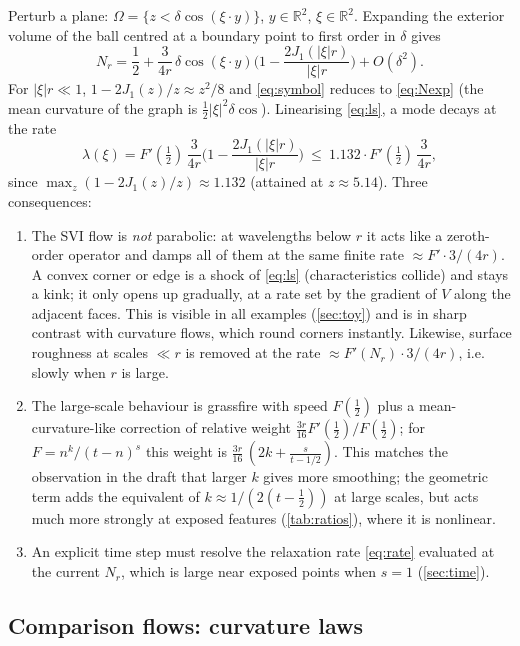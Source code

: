 \documentclass[11pt]{article}
\newcommand{\R}{\mathbb{R}}
\newcommand{\N}{N_r}
\begin{document}
Perturb a plane: $\Omega=\{z<\delta\cos(\xi\cdot y)\}$, $y\in\R^2$, $\xi\in\R^2$. Expanding the exterior
volume of the ball centred at a boundary point to first order in $\delta$ gives
\begin{equation}\label{eq:symbol}
\N = \frac12+\frac{3}{4r}\,\delta\cos(\xi\cdot y)\Big(1-\frac{2J_1(|\xi| r)}{|\xi| r}\Big)+O(\delta^2).
\end{equation}
For $|\xi|r\ll1$, $1-2J_1(z)/z\approx z^2/8$ and \eqref{eq:symbol} reduces to \eqref{eq:Nexp} (the
mean curvature of the graph is $\frac12|\xi|^2\delta\cos$). Linearising \eqref{eq:ls}, a mode decays at
the rate
\begin{equation}\label{eq:rate}
\lambda(\xi)=F'(\tfrac12)\,\frac{3}{4r}\Big(1-\frac{2J_1(|\xi| r)}{|\xi| r}\Big)\ \le\ 1.132\cdot F'(\tfrac12)\,\frac{3}{4r},
\end{equation}
since $\max_z(1-2J_1(z)/z)\approx1.132$ (attained at $z\approx5.14$). Three consequences:
\begin{enumerate}
\item The SVI flow is \emph{not} parabolic: at wavelengths below $r$ it acts like a zeroth-order operator
and damps all of them at the same finite rate $\approx F'\cdot3/(4r)$. A convex corner or edge is a shock
of \eqref{eq:ls} (characteristics collide) and stays a kink; it only opens up gradually, at a rate set by
the gradient of $V$ along the adjacent faces. This is visible in all examples (\cref{sec:toy}) and is in
sharp contrast with curvature flows, which round corners instantly. Likewise, surface roughness at scales
$\ll r$ is removed at the rate $\approx F'(\N)\cdot3/(4r)$, i.e. slowly when $r$ is large.
\item The large-scale behaviour is grassfire with speed $F(\frac12)$ plus a mean-curvature-like correction
of relative weight $\frac{3r}{16}F'(\frac12)/F(\frac12)$; for $F=n^k/(t-n)^s$ this weight is
$\frac{3r}{16}\,(2k+\frac{s}{t-1/2})$. This matches the observation in the draft that larger $k$ gives
more smoothing; the geometric term adds the equivalent of $k\approx 1/(2(t-\frac12))$ at large scales, but
acts much more strongly at exposed features (\cref{tab:ratios}), where it is nonlinear.
\item An explicit time step must resolve the relaxation rate \eqref{eq:rate} evaluated at the current
$\N$, which is large near exposed points when $s=1$ (\cref{sec:time}).
\end{enumerate}

\subsection{Comparison flows: curvature laws}\label{sec:curvlaws}
\end{document}
